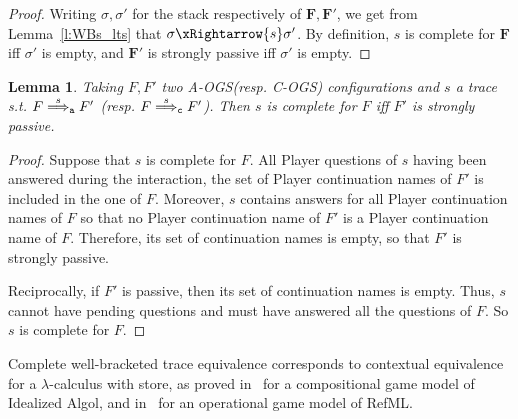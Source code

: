 \documentclass[11pt,a4paper]{amsart}
\theoremstyle{plain}
\theoremstyle{definition}
\theoremstyle{defC}
\theoremstyle{thmC}
\theoremstyle{plain}
\numberwithin{equation}{section}
\newcommand{\tr}{s}
\newcommand{\stt}{\sigma}
\newcommand{\AOGS}{\mbox{{\rm A-OGS}}\xspace}      %
\newcommand{\COGS}{\mbox{{\rm C-OGS}}\xspace}      %
\newcommand{\WBOGS}{\mbox{{\rm WB-OGS}}\xspace}      %
\newcommand{\rmm}[1]{{\tt{\lowercase{#1}}}}
\newcommand{\genArr}[2]{\mathrel{\stackrel{{#1}}{\Longrightarrow}_{\rmm{\lowercase{#2}}}}}  %
\newcommand{\ArrA}[1]{\genArr{#1}{A}}  %
\newcommand{\ArrC}[1]{\genArr{#1}{C}}   %
\newcommand{\genTEcomp}[1]{\mathrel{\bumpeq^{\rm c}_{\rm{\lowercase{#1}}}}} %
\newcommand{\TEwbc}{\genTEcomp{WB}}       %
\newcommand{\FF}{F}
\newcommand{\FFb}{{\bm{\FF}}} %
\newcommand{\LasV}{\Lambda_{\rm V}} %
\newcommand{\initconf}[2]{\langle[? \mapsto #2], #1\rangle}
\newcommand{\lambdarho}{\lambda\rho}
\newcommand{\ctxeqlr}{=_{\rm{ctx}}^{\lambda \rho}}
\newcommand{\pshdsym}{\mathsf{pshd}}
\newcommand{\pshdTrans}[1]{\xRightarrow{#1}}%
\theoremstyle{plain}
\newtheorem{theorem}[thm]{Theorem}
\newtheorem{lemma}[thm]{Lemma}
\theoremstyle{definition}
\newcommand{\cutLMCSsecondRound}[1]{}
\begin{document}
\begin{proof}
  Writing $\stt,\stt'$ for the stack respectively of $\FFb,\FFb'$,
  we get from Lemma~\ref{l:WBs_lts} that
  $\stt \pshdTrans{\tr} \stt'$.
  By definition, $\tr$ is complete for $\FFb$ iff $\stt'$ is empty,
  and $\FFb'$ is strongly passive iff $\stt'$ is empty.
\end{proof}

\begin{lemma}
  \label{l:OGS_complete-strongly-passive}
    Taking $\FF,\FF'$ two \AOGS (resp. \COGS) configurations
    and $\tr$ a trace  s.t. $\FF \ArrA \tr \FF'$
    (resp. $\FF \ArrC \tr \FF'$).  
    Then $\tr$ is complete for $\FF$
    iff $\FF'$ is strongly passive. 
\end{lemma} 

\begin{proof}
  Suppose that $\tr$ is complete for $\FF$.
  All Player questions of $\tr$ having been answered during the interaction, 
  the set of Player continuation names of $\FF'$
  is included in the one of $\FF$.
  Moreover, $\tr$ contains answers for all Player continuation names of $\FF$
  so that no Player continuation name of $\FF'$ is a Player continuation name of $\FF$.
  Therefore, its set of continuation names is empty,
  so that $\FF'$ is strongly passive.

  Reciprocally, if $\FF'$ is passive, then its set of continuation names is empty.
  Thus, $\tr$ cannot have pending questions and must
  have answered all the questions of $\FF$.
  So $\tr$ is complete for $\FF$.
\end{proof}
\noindent
Complete well-bracketed trace equivalence corresponds to contextual equivalence for a 
$\lambda$-calculus with store, as proved in~\cite{abramsky1997linearity} for 
a compositional game model of Idealized Algol,
and in~\cite{laird2007} for an operational game model of RefML.
\cutLMCSsecondRound{
This last result can be adapted to the $\lambdarho$-calculus, 
an untyped call-by-value language with store. Its definition is given in 
Appendix~\ref{a:LambdaRho}, with the definition of 
its contextual equivalence $\ctxeqlr$.
Being a language where the exchange of locations is forbidden,
the proof of full abstraction of the \WBOGS semantics
for $\lambdarho$-calculus can be obtained by a direct adaptation of the result proven in~\cite{JM21}
for the `HOS' language.

\begin{theorem}
\label{t:rho}
Let $M_1,M_2 \in \LasV$
 with free variables in $\phi$.
We have $\initconf{\phi}{M} \TEwbc \initconf{\phi}{N}$
 iff  $M \ctxeqlr N$.
\end{theorem}}
\end{document}
